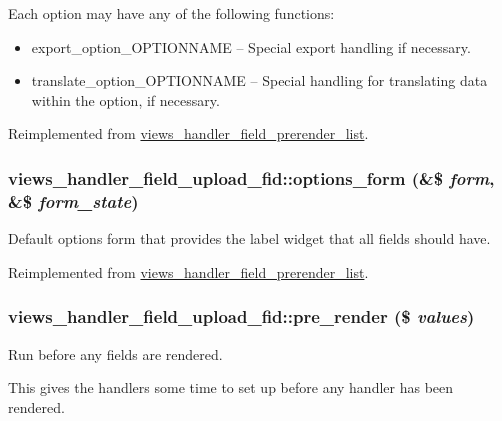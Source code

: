  Each option may have any of the following functions:\begin{itemize}
\item export\_\-option\_\-OPTIONNAME -- Special export handling if necessary.\item translate\_\-option\_\-OPTIONNAME -- Special handling for translating data within the option, if necessary. \end{itemize}


Reimplemented from \hyperlink{classviews__handler__field__prerender__list_3787d1e3974a37c72f71c062eee52b3d}{views\_\-handler\_\-field\_\-prerender\_\-list}.\hypertarget{classviews__handler__field__upload__fid_b39479eb80cfba952037f37e930d1b6e}{
\subsubsection[{options\_\-form}]{\setlength{\rightskip}{0pt plus 5cm}views\_\-handler\_\-field\_\-upload\_\-fid::options\_\-form (\&\$ {\em form}, \/  \&\$ {\em form\_\-state})}}
\label{classviews__handler__field__upload__fid_b39479eb80cfba952037f37e930d1b6e}


Default options form that provides the label widget that all fields should have. 

Reimplemented from \hyperlink{classviews__handler__field__prerender__list_6a88df29dbdd11aefc5d108dca6530e0}{views\_\-handler\_\-field\_\-prerender\_\-list}.\hypertarget{classviews__handler__field__upload__fid_5f4bd6d947086120d041e1e27571804d}{
\subsubsection[{pre\_\-render}]{\setlength{\rightskip}{0pt plus 5cm}views\_\-handler\_\-field\_\-upload\_\-fid::pre\_\-render (\$ {\em values})}}
\label{classviews__handler__field__upload__fid_5f4bd6d947086120d041e1e27571804d}


Run before any fields are rendered.

This gives the handlers some time to set up before any handler has been rendered.

